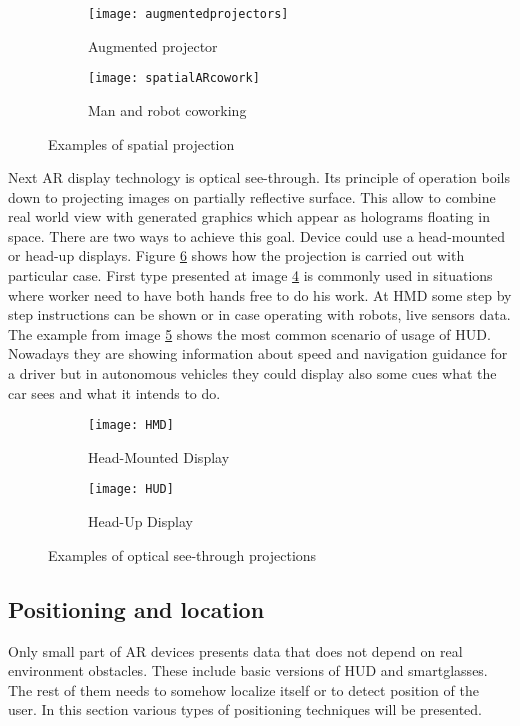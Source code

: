 \documentclass[printmode,en]{mgr}
\begin{document}
\begin{figure}[!ht]
\centering
\begin{subfigure}{.4\textwidth}
  \centering
  \texttt{[image: augmentedprojectors]}
  \caption{Augmented projector \cite{augmentedprojectors}}
  \label{fig:augmentedprojectors}
\end{subfigure}%
\begin{subfigure}{.4\textwidth}
  \centering
  \texttt{[image: spatialARcowork]}
  \caption{Man and robot coworking \cite{SpatialARCollaborative}}
  \label{fig:spatialARcowork}
\end{subfigure}
\caption{Examples of spatial projection}
\label{fig:spatialAR}
\end{figure}

Next AR display technology is optical see-through. Its principle of operation boils down to projecting images on partially reflective surface. This allow to combine real world view with generated graphics which appear as holograms floating in space. There are two ways to achieve this goal. Device could use a head-mounted or head-up displays. Figure \ref{fig:seeThroughAR} shows how the projection is carried out with particular case. First type presented at image \ref{fig:headMounted} is commonly used in situations where worker need to have both hands free to do his work. At HMD some step by step instructions can be shown or in case operating with robots, live sensors data. The example from image \ref{fig:headUp} shows the most common scenario of usage of HUD. Nowadays they are showing information about speed and navigation guidance for a driver but in autonomous vehicles they could display also some cues what the car sees and what it intends to do.

\begin{figure}[!ht]
\centering
\begin{subfigure}{.5\textwidth}
  \centering
  \texttt{[image: HMD]}
  \caption{Head-Mounted Display}
  \label{fig:headMounted}
\end{subfigure}%
\begin{subfigure}{.5\textwidth}
  \centering
  \texttt{[image: HUD]}
  \caption{Head-Up Display \cite{HUD}}
  \label{fig:headUp}
\end{subfigure}
\caption{Examples of optical see-through projections}
\label{fig:seeThroughAR}
\end{figure}

\subsection{Positioning and location}
Only small part of AR devices presents data that does not depend on real environment obstacles. These include basic versions of HUD and smartglasses. The rest of them needs to somehow localize itself or to detect position of the user. In this section various types of positioning techniques will be presented.\\
\end{document}
